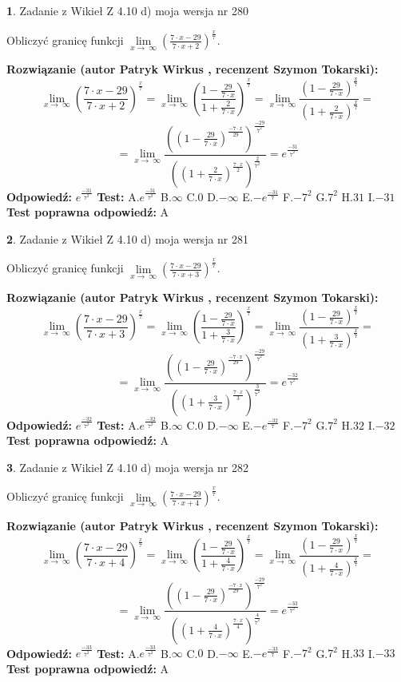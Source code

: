 \documentclass[12pt, a4paper]{article}
\theoremstyle{definition} %
\newtheorem{zad}{}
\newcommand{\zadStart}[1]{\begin{zad}#1\newline}
\newcommand{\zadStop}{\end{zad}}
\newcommand{\rozwStart}[2]{\noindent \textbf{Rozwiązanie (autor #1 , recenzent #2): }\newline}
\newcommand{\rozwStop}{\newline}
\newcommand{\odpStart}{\noindent \textbf{Odpowiedź:}\newline}
\newcommand{\odpStop}{\newline}
\newcommand{\testStart}{\noindent \textbf{Test:}\newline}
\newcommand{\testStop}{\newline}
\newcommand{\kluczStart}{\noindent \textbf{Test poprawna odpowiedź:}\newline}
\newcommand{\kluczStop}{\newline}
\begin{document}
\zadStart{Zadanie z Wikieł Z 4.10 d) moja wersja nr 280}


Obliczyć granicę funkcji  $\lim\limits_{x\to\ \infty}(\frac{7\cdot x-29}{7\cdot x+2})^{\frac{x}{7}}$.
\zadStop
\rozwStart{Patryk Wirkus}{Szymon Tokarski}
$$\lim\limits_{x\to\ \infty}(\frac{7\cdot x-29}{7\cdot x+2})^{\frac{x}{7}} = \lim\limits_{x\to\ \infty}(\frac{1-\frac{29}{7\cdot x}}{1+\frac{2}{7\cdot x}})^{\frac{x}{7}}=\lim\limits_{x\to\ \infty}\frac{(1-\frac{29}{7\cdot x})^{\frac{x}{7}}}{(1+\frac{2}{7\cdot x})^{\frac{x}{7}}}=$$
$$=\lim\limits_{x\to\ \infty}\frac{((1-\frac{29}{7\cdot x})^{\frac{-7\cdot x}{29}})^{\frac{-29}{7^{2}}}}{((1+\frac{2}{7\cdot x})^{\frac{7\cdot x}{2}})^{\frac{2}{7^{2}}}}=e^{\frac{-31}{7^{2}}}$$
\rozwStop
\odpStart
$e^{\frac{-31}{7^{2}}}$
\odpStop
\testStart
A.$e^{\frac{-31}{7^{2}}}$ B.$\infty$ C.$0$ D.$-\infty$ E.$-e^{\frac{-31}{7}}$
F.$-7^{2}$ G.$7^{2}$
H.$31$
I.$-31$
\testStop
\kluczStart
A
\kluczStop



\zadStart{Zadanie z Wikieł Z 4.10 d) moja wersja nr 281}


Obliczyć granicę funkcji  $\lim\limits_{x\to\ \infty}(\frac{7\cdot x-29}{7\cdot x+3})^{\frac{x}{7}}$.
\zadStop
\rozwStart{Patryk Wirkus}{Szymon Tokarski}
$$\lim\limits_{x\to\ \infty}(\frac{7\cdot x-29}{7\cdot x+3})^{\frac{x}{7}} = \lim\limits_{x\to\ \infty}(\frac{1-\frac{29}{7\cdot x}}{1+\frac{3}{7\cdot x}})^{\frac{x}{7}}=\lim\limits_{x\to\ \infty}\frac{(1-\frac{29}{7\cdot x})^{\frac{x}{7}}}{(1+\frac{3}{7\cdot x})^{\frac{x}{7}}}=$$
$$=\lim\limits_{x\to\ \infty}\frac{((1-\frac{29}{7\cdot x})^{\frac{-7\cdot x}{29}})^{\frac{-29}{7^{2}}}}{((1+\frac{3}{7\cdot x})^{\frac{7\cdot x}{3}})^{\frac{3}{7^{2}}}}=e^{\frac{-32}{7^{2}}}$$
\rozwStop
\odpStart
$e^{\frac{-32}{7^{2}}}$
\odpStop
\testStart
A.$e^{\frac{-32}{7^{2}}}$ B.$\infty$ C.$0$ D.$-\infty$ E.$-e^{\frac{-32}{7}}$
F.$-7^{2}$ G.$7^{2}$
H.$32$
I.$-32$
\testStop
\kluczStart
A
\kluczStop



\zadStart{Zadanie z Wikieł Z 4.10 d) moja wersja nr 282}


Obliczyć granicę funkcji  $\lim\limits_{x\to\ \infty}(\frac{7\cdot x-29}{7\cdot x+4})^{\frac{x}{7}}$.
\zadStop
\rozwStart{Patryk Wirkus}{Szymon Tokarski}
$$\lim\limits_{x\to\ \infty}(\frac{7\cdot x-29}{7\cdot x+4})^{\frac{x}{7}} = \lim\limits_{x\to\ \infty}(\frac{1-\frac{29}{7\cdot x}}{1+\frac{4}{7\cdot x}})^{\frac{x}{7}}=\lim\limits_{x\to\ \infty}\frac{(1-\frac{29}{7\cdot x})^{\frac{x}{7}}}{(1+\frac{4}{7\cdot x})^{\frac{x}{7}}}=$$
$$=\lim\limits_{x\to\ \infty}\frac{((1-\frac{29}{7\cdot x})^{\frac{-7\cdot x}{29}})^{\frac{-29}{7^{2}}}}{((1+\frac{4}{7\cdot x})^{\frac{7\cdot x}{4}})^{\frac{4}{7^{2}}}}=e^{\frac{-33}{7^{2}}}$$
\rozwStop
\odpStart
$e^{\frac{-33}{7^{2}}}$
\odpStop
\testStart
A.$e^{\frac{-33}{7^{2}}}$ B.$\infty$ C.$0$ D.$-\infty$ E.$-e^{\frac{-33}{7}}$
F.$-7^{2}$ G.$7^{2}$
H.$33$
I.$-33$
\testStop
\kluczStart
A
\kluczStop
\end{document}
